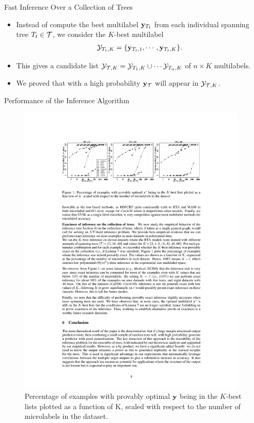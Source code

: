 \documentclass[first=dgreen,second=purple,logo=yellowexc]{aaltoslides}
\begin{document}
%
\begin{frame}{Fast Inference Over a Collection of Trees}
	\begin{itemize}
		\item Instead of compute the best multilabel $\mathbf {y}_{T_t}$ from each individual spanning tree $T_t\in\mathcal{T}$, we consider the $K$-best multilabel 
		\begin{align*}
			\mathcal{Y}_{T_t,K} = \{\mathbf {y}_{T_t,1},\cdots,\mathbf {y}_{T_t,K}\}.
		\end{align*}
		\item This gives a candidate list $\mathcal{Y}_{\mathcal{T},K}=\mathcal{Y}_{T_1,K}\cup\cdots\mathcal{Y}_{T_n,K}$ of $n\times K$ multilabels.
		\item We proved that with a high probability $\mathbf {y}_{\mathcal{T}}$ will appear in $\mathcal{Y}_{\mathcal{T},K}$.
	\end{itemize}
\end{frame}



%
\begin{frame}{Performance of the Inference Algorithm}
	\begin{figure}
		\begin{center}
			\includegraphics[width=11cm]{./result_plot.pdf}
			\caption{Percentage of examples with provably optimal $\mathbf {y}$ being in the $K$-best lists plotted as a function of K, scaled with respect to the number of microlabels in the dataset.}
		\end{center}
	\end{figure}
\end{frame}
\end{document}
